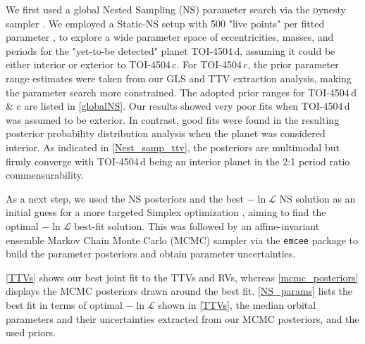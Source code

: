 \documentclass[twocolumn,twocolappendix]{aastex631}
\let\orgautoref\autoref
\renewcommand{\autoref}
        {\def\equationautorefname{Eq.}%
         \def\figureautorefname{Fig.}%
         \def\sectionautorefname{Sect.}%
         \def\subsectionautorefname{Sect.}%
         \def\subsubsectionautorefname{Sect.}%
         \orgautoref}
\begin{document}
We first used a global Nested Sampling (NS) parameter search \citep{Skilling2004} via the {\textsc dynesty} sampler \citep{Speagle2020}. We employed a Static-NS setup with 500 "live points" per fitted parameter \citep[see][for details]{Speagle2020}, to explore a wide parameter space of 
eccentricities, masses, and periods for the "yet-to-be detected" planet TOI-4504\,d, assuming it could be either interior or exterior to TOI-4504\,c. For TOI-4504\,c, the prior parameter range estimates were taken from our GLS and TTV extraction analysis, making the parameter search more constrained. The adopted prior ranges for TOI-4504\,d \& c are listed in \autoref{globalNS}. Our results showed very poor fits when TOI-4504\,d was assumed to be exterior. In contrast, good fits were found in the resulting posterior probability distribution analysis when the planet was considered interior. As indicated in \autoref{Nest_samp_ttv}, the posteriors are multimodal but firmly converge with TOI-4504\,d being an interior planet in the 2:1 period ratio commensurability.



As a next step, we used the NS posteriors and the best $-\ln\mathcal{L}$ NS solution as an initial guess for a more targeted Simplex optimization \citep{NelderMead}, aiming to find the optimal $-\ln\mathcal{L}$ best-fit solution. This was followed by an affine-invariant ensemble Markov Chain Monte Carlo (MCMC) sampler \citep{Goodman2010} via the \texttt{emcee} package \citep{emcee} to build the parameter posteriors and obtain parameter uncertainties.

\autoref{TTVs} shows our best joint fit to the TTVs and RVs, whereas 
\autoref{mcmc_posteriors} displays the MCMC posteriors drawn around the best fit. \autoref{NS_params} lists the best fit in terms of optimal $-\ln\mathcal{L}$ shown in \autoref{TTVs}, the median orbital parameters and their uncertainties extracted from our MCMC posteriors, and the used priors.
\end{document}

